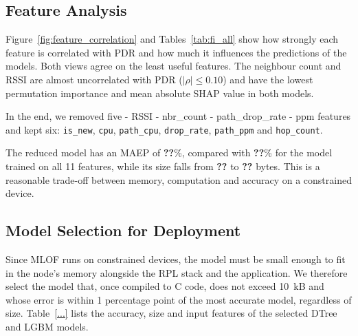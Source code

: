 \subsection{Feature Analysis}
Figure~\ref{fig:feature_correlation} and Tables~\ref{tab:fi_all} show
how strongly each feature is correlated with PDR and how much it influences the
predictions of the models.
Both views agree on the least useful features.
The neighbour count and RSSI are almost uncorrelated with PDR
($|\rho| \le 0.10$) and have the lowest permutation importance and
mean absolute SHAP value in both models.

In the end, we removed five
- RSSI
- nbr_count
- path_drop_rate
- ppm
features and kept six:
\texttt{is\_new}, \texttt{cpu}, \texttt{path\_cpu}, \texttt{drop\_rate},
\texttt{path\_ppm} and \texttt{hop\_count}.

The reduced model has an MAEP of \textbf{??}\%, compared with
\textbf{??}\% for the model trained on all 11 features, while its
size falls from \textbf{??} to \textbf{??} bytes.
This is a reasonable trade-off between memory, computation and
accuracy on a constrained device.

\subsection{Model Selection for Deployment}
Since MLOF runs on constrained devices, the model must be small enough
to fit in the node's memory alongside the RPL stack and the
application. We therefore select the model that, once compiled to C
code, does not exceed 10~kB and whose error is within 1 percentage
point of the most accurate model, regardless of size.
Table~\ref{...} lists the accuracy, size and input features of the
selected DTree and LGBM models.
